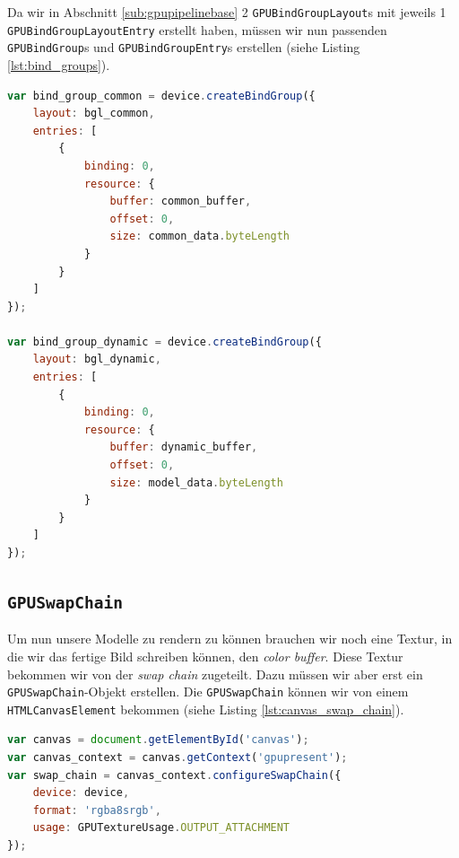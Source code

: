 \documentclass[oneside]{ausarbeitung}
\begin{document}
Da wir in Abschnitt \ref{sub:gpupipelinebase} 2 \texttt{GPUBindGroupLayout}s mit jeweils 1 \texttt{GPUBindGroupLayoutEntry} erstellt haben, müssen wir nun passenden \texttt{GPUBindGroup}s und \texttt{GPUBindGroupEntry}s erstellen (siehe Listing \ref{lst:bind_groups}).

\begin{minipage}{\textwidth}
\begin{lstlisting}[language=JavaScript, label={lst:bind_groups}, caption={Erstellen der \texttt{GPUBindGroup}s für \textit{common} und \textit{dynamic data}.}]
var bind_group_common = device.createBindGroup({
    layout: bgl_common,
    entries: [
        {
            binding: 0,
            resource: {
                buffer: common_buffer,
                offset: 0,
                size: common_data.byteLength
            }
        }
    ]
});

var bind_group_dynamic = device.createBindGroup({
    layout: bgl_dynamic,
    entries: [
        {
            binding: 0,
            resource: {
                buffer: dynamic_buffer,
                offset: 0,
                size: model_data.byteLength
            }
        }
    ]
});
\end{lstlisting}
\end{minipage}

\subsection{\texttt{GPUSwapChain}}
Um nun unsere Modelle zu rendern zu können brauchen wir noch eine Textur, in die wir das fertige Bild schreiben können, den \textit{color buffer}. Diese Textur bekommen wir von der \textit{swap chain} \cite{wikipedia:swap_chain} zugeteilt. Dazu müssen wir aber erst ein \texttt{GPUSwapChain}-Objekt erstellen. Die \texttt{GPUSwapChain} können wir von einem \texttt{HTMLCanvasElement} bekommen (siehe Listing \ref{lst:canvas_swap_chain}).

\begin{minipage}{\textwidth}
\begin{lstlisting}[language=JavaScript, label={lst:canvas_swap_chain}, caption={Erstellen einer \texttt{GPUSwapChain} von einem \texttt{HTMLCanvasElement}}]
var canvas = document.getElementById('canvas');
var canvas_context = canvas.getContext('gpupresent');
var swap_chain = canvas_context.configureSwapChain({
    device: device,
    format: 'rgba8srgb',
    usage: GPUTextureUsage.OUTPUT_ATTACHMENT
});
\end{lstlisting}
\end{minipage}
\end{document}
